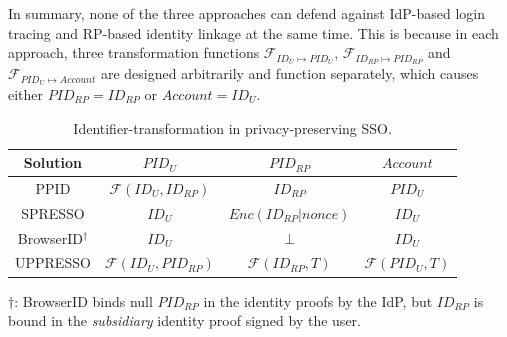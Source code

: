 In summary, none of the three approaches can defend against IdP-based login tracing and RP-based identity linkage at the same time. This is because in each approach, three transformation functions $\mathcal{F}_{ID_{U} \mapsto PID_U}$, $\mathcal{F}_{ID_{RP} \mapsto PID_{RP}}$ and $\mathcal{F}_{PID_{U} \mapsto Account}$ are designed arbitrarily and function separately, which causes either $PID_{RP} = ID_{RP}$ or $Account = ID_U$.


\begin{table}[tb]
\scriptsize
    \caption{Identifier-transformation in privacy-preserving SSO.}
    \centering
    \setlength{\tabcolsep}{1.2mm}
    \begin{tabular}{|c|c|c|c|}
    \hline
    {\textbf{Solution}} & {\textbf{$PID_{U}$}} & {\textbf{$PID_{RP}$}} & {\textbf{$Account$}}\\
    \hline
    {PPID} & {{$\mathcal{F}(ID_U,ID_{RP})$}} & {{$ID_{RP}$}} & {{$PID_U$}}\\
    \hline
    {SPRESSO} & {{$ID_U$}} & {{$Enc(ID_{RP}|nonce)$}} &{{$ID_U$}}\\
    \hline
    {BrowserID$^\dag$} & {{$ID_U$}} & {{$\bot$}} &{{$ID_U$}}\\
    \hline
    {UPPRESSO} & {{$\mathcal{F}(ID_U, PID_{RP})$}} & {{$\mathcal{F}(ID_{RP}, T)$}} &{{$\mathcal{F}(PID_U, T)$}}\\
    \hline
    \end{tabular}
\flushleft
{\footnotesize
$\dag$: BrowserID binds null $PID_{RP}$ in the identity proofs by the IdP,
    but $ID_{RP}$ is bound in the \emph{subsidiary} identity proof signed by the user.}
    \label{tbl:compare}
    \vspace{-5mm}
\end{table}

